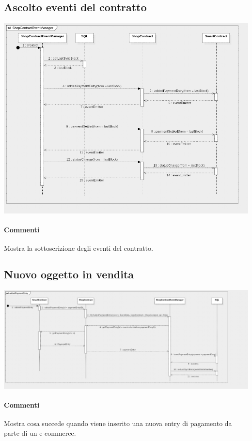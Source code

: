 \documentclass[a4paper, 12pt]{article}
\begin{document}
\subsection{Ascolto eventi del contratto}
\includegraphics[width=1.0\textwidth]{shopContractEventManager}
\paragraph{Commenti}
Mostra la sottoscrizione degli eventi del contratto.

\subsection{Nuovo oggetto in vendita}
\includegraphics[width=1.0\textwidth]{addedPaymentEntry}
\paragraph{Commenti}
Mostra cosa succede quando viene inserito una nuova entry di pagamento da parte di un e-commerce.
\end{document}
